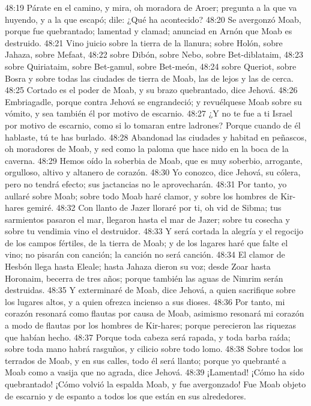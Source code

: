 48:19 Párate en el camino, y mira, oh moradora de Aroer; pregunta a la que va huyendo, y a la que escapó; dile: ¿Qué ha acontecido? 
48:20 Se avergonzó Moab, porque fue quebrantado; lamentad y clamad; anunciad en Arnón que Moab es destruido. 
48:21 Vino juicio sobre la tierra de la llanura; sobre Holón, sobre Jahaza, sobre Mefaat, 
48:22 sobre Dibón, sobre Nebo, sobre Bet-diblataim, 
48:23 sobre Quiriataim, sobre Bet-gamul, sobre Bet-meón, 
48:24 sobre Queriot, sobre Bosra y sobre todas las ciudades de tierra de Moab, las de lejos y las de cerca. 
48:25 Cortado es el poder de Moab, y su brazo quebrantado, dice Jehová. 
48:26 Embriagadle, porque contra Jehová se engrandeció; y revuélquese Moab sobre su vómito, y sea también él por motivo de escarnio. 
48:27 ¿Y no te fue a ti Israel por motivo de escarnio, como si lo tomaran entre ladrones? Porque cuando de él hablaste, tú te has burlado. 
48:28 Abandonad las ciudades y habitad en peñascos, oh moradores de Moab, y sed como la paloma que hace nido en la boca de la caverna. 
48:29 Hemos oído la soberbia de Moab, que es muy soberbio, arrogante, orgulloso, altivo y altanero de corazón. 
48:30 Yo conozco, dice Jehová, su cólera, pero no tendrá efecto; sus jactancias no le aprovecharán. 
48:31 Por tanto, yo aullaré sobre Moab; sobre todo Moab haré clamor, y sobre los hombres de Kir-hares gemiré. 
48:32 Con llanto de Jazer lloraré por ti, oh vid de Sibma; tus sarmientos pasaron el mar, llegaron hasta el mar de Jazer; sobre tu cosecha y sobre tu vendimia vino el destruidor. 
48:33 Y será cortada la alegría y el regocijo de los campos fértiles, de la tierra de Moab; y de los lagares haré que falte el vino; no pisarán con canción; la canción no será canción. 
48:34 El clamor de Hesbón llega hasta Eleale; hasta Jahaza dieron su voz; desde Zoar hasta Horonaim, becerra de tres años; porque también las aguas de Nimrim serán destruidas. 
48:35 Y exterminaré de Moab, dice Jehová, a quien sacrifique sobre los lugares altos, y a quien ofrezca incienso a sus dioses. 
48:36 Por tanto, mi corazón resonará como flautas por causa de Moab, asimismo resonará mi corazón a modo de flautas por los hombres de Kir-hares; porque perecieron las riquezas que habían hecho. 
48:37 Porque toda cabeza será rapada, y toda barba raída; sobre toda mano habrá rasguños, y cilicio sobre todo lomo. 
48:38 Sobre todos los terrados de Moab, y en sus calles, todo él será llanto; porque yo quebranté a Moab como a vasija que no agrada, dice Jehová. 
48:39 ¡Lamentad! ¡Cómo ha sido quebrantado! ¡Cómo volvió la espalda Moab, y fue avergonzado! Fue Moab objeto de escarnio y de espanto a todos los que están en sus alrededores. 
